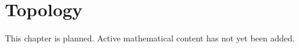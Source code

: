 \section{Topology}

\begin{remark*}[Status]
This chapter is planned. Active mathematical content has not yet been added.
\end{remark*}
